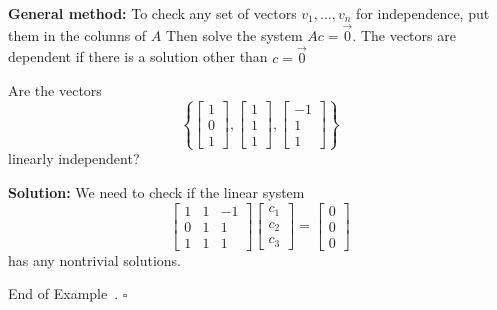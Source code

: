 \documentclass[10pt]{article}
\theoremstyle{definition}
\newtheorem{example}[theorem]{Example}
\renewenvironment{example}
{\begin{oldexample}}
  {\par\smallskip\hfill   End of Example~\theexample. $\square$    \par\end{oldexample}}
\begin{document}
\textbf{General method:} To check any set of vectors $v_{1},\ldots,v_{n}$
for independence, put them in the colunns of $A$ Then solve the system
$Ac=\vec{0}$. The vectors are dependent if there is a solution other than
$c=\vec{0} $

\begin{example}
  \label{ex:linear-independence-1}
  Are the vectors
  \begin{equation*}
    \left\{
      \begin{bmatrix}
        1\\0\\1
      \end{bmatrix},
      \begin{bmatrix}
        1\\1\\1
      \end{bmatrix},
      \begin{bmatrix}
        -1\\1\\1
      \end{bmatrix}
    \right\}
  \end{equation*}
  linearly independent?

  \textbf{Solution:}
  We need to check if the linear system
  \begin{equation*}
    \begin{bmatrix}
      1&1&-1\\
      0&1&1\\
      1&1&1
    \end{bmatrix}
    \begin{bmatrix}
      c_{1}\\c_{2}\\c_{3}
    \end{bmatrix}
    =
    \begin{bmatrix}
      0\\0\\0
    \end{bmatrix}
  \end{equation*}
  has any nontrivial solutions.


\end{example}
\end{document}
